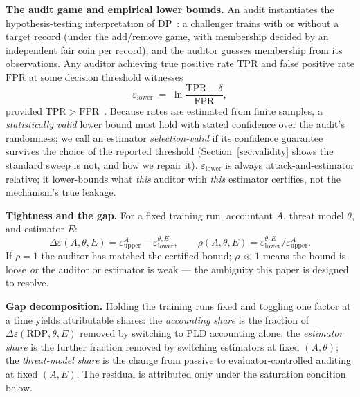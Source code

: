 \documentclass{article}
\begin{document}
\textbf{The audit game and empirical lower bounds.} An audit instantiates the hypothesis-testing interpretation of DP~\citep{balle2020hypothesis}: a challenger trains with or without a target record (under the add/remove game, with membership decided by an independent fair coin per record), and the auditor guesses membership from its observations. Any auditor achieving true positive rate $\mathrm{TPR}$ and false positive rate $\mathrm{FPR}$ at some decision threshold witnesses
\begin{equation}
    \varepsilon_{\text{lower}} \;=\; \ln\!\frac{\mathrm{TPR} - \delta}{\mathrm{FPR}},
\end{equation}
provided $\mathrm{TPR} > \mathrm{FPR}$~\citep{jagielski2020auditing}. Because rates are estimated from finite samples, a \emph{statistically valid} lower bound must hold with stated confidence over the audit's randomness; we call an estimator \emph{selection-valid} if its confidence guarantee survives the choice of the reported threshold (Section~\ref{sec:validity} shows the standard sweep is not, and how we repair it). $\varepsilon_{\text{lower}}$ is always attack-and-estimator relative; it lower-bounds what \emph{this} auditor with \emph{this} estimator certifies, not the mechanism's true leakage.

\textbf{Tightness and the gap.} For a fixed training run, accountant $A$, threat model $\theta$, and estimator $E$:
\begin{equation}
    \Delta\varepsilon(A, \theta, E) = \varepsilon^{A}_{\text{upper}} - \varepsilon^{\theta,E}_{\text{lower}},
    \qquad
    \rho(A, \theta, E) = \varepsilon^{\theta,E}_{\text{lower}} / \varepsilon^{A}_{\text{upper}}.
\end{equation}
If $\rho = 1$ the auditor has matched the certified bound; $\rho \ll 1$ means the bound is loose \emph{or} the auditor or estimator is weak --- the ambiguity this paper is designed to resolve.

\textbf{Gap decomposition.} Holding the training runs fixed and toggling one factor at a time yields attributable shares: the \emph{accounting share} is the fraction of $\Delta\varepsilon(\text{RDP}, \theta, E)$ removed by switching to PLD accounting alone; the \emph{estimator share} is the further fraction removed by switching estimators at fixed $(A,\theta)$; the \emph{threat-model share} is the change from passive to evaluator-controlled auditing at fixed $(A,E)$. The residual is attributed only under the saturation condition below.
\end{document}
